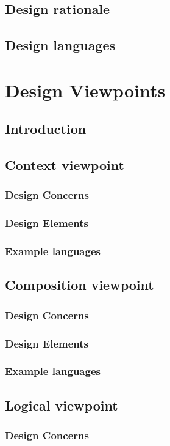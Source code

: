 \documentclass[onecolumn, draftclsnofoot,10pt, compsoc]{IEEEtran}
\begin{document}
\begin{singlespace}
	\subsection{Design rationale}
	\subsection{Design languages}
\section{Design Viewpoints}
	\subsection{Introduction}
	\subsection{Context viewpoint}
		\subsubsection{Design Concerns}
		\subsubsection{Design Elements}
		\subsubsection{Example languages}
	\subsection{Composition viewpoint}
		\subsubsection{Design Concerns}
		\subsubsection{Design Elements}
		\subsubsection{Example languages}
	\subsection{Logical viewpoint}
		\subsubsection{Design Concerns}

\end{singlespace}
\end{document}

